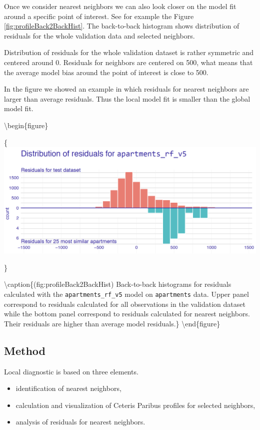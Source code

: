 \documentclass[12pt,]{krantz}
\providecommand{\tightlist}{%
  \setlength{\itemsep}{0pt}\setlength{\parskip}{0pt}}
\theoremstyle{definition}
\theoremstyle{definition}
\theoremstyle{definition}
\theoremstyle{remark}
\begin{document}
Once we consider nearest neighbors we can also look closer on the model
fit around a specific point of interest. See for example the Figure
\ref{fig:profileBack2BackHist}. The back-to-back histogram shows
distribution of residuals for the whole validation data and selected
neighbors.

Distribution of residuals for the whole validation dataset is rather
symmetric and centered around 0. Residuals for neighbors are centered on
500, what means that the average model bias around the point of interest
is close to 500.

In the figure we showed an example in which residuals for nearest
neighbors are larger than average residuals. Thus the local model fit is
smaller than the global model fit.

\textbackslash{}begin\{figure\}

\{\centering \includegraphics[width=0.7\linewidth]{figure/bb_hist}

\}

\textbackslash{}caption\{(fig:profileBack2BackHist) Back-to-back
histograms for residuals calculated with the \texttt{apartments\_rf\_v5}
model on \texttt{apartments} data. Upper panel correspond to residuals
calculated for all observations in the validation dataset while the
bottom panel correspond to residuals calculated for nearest neighbors.
Their residuals are higher than average model
residuals.\}\label{fig:profileBack2BackHist} \textbackslash{}end\{figure\}

\hypertarget{method-3}{%
\subsection{Method}\label{method-3}}

Local diagnostic is based on three elements.

\begin{itemize}
\tightlist
\item
  identification of nearest neighbors,
\item
  calculation and visualization of Ceteris Paribus profiles for selected
  neighbors,
\item
  analysis of residuals for nearest neighbors.
\end{itemize}
\end{document}
